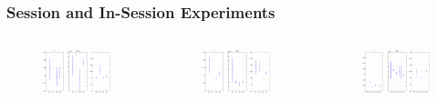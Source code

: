 \documentclass[9pt,handout,serif]{beamer}
\begin{document}
\begin{frame}
	\frametitle{Session and In-Session Experiments}
	\begin{columns}
		\begin{figure}
			\centering
			\includegraphics[width=1\textwidth]{../images/results/localview/session_experiment/5sessions}
		\end{figure}
		\begin{figure}
			\centering
			\includegraphics[width=1\textwidth]{../images/results/localview/session_experiment/10sessions}
		\end{figure}
		\begin{figure}
			\centering
			\includegraphics[width=1\textwidth]{../images/results/localview/session_experiment/15sessions}

\end{figure}
\end{columns}
\end{frame}
\end{document}
